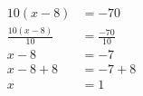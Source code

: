 \documentclass[12pt]{article}
\begin{document}
\begin{multicols}{2}
\begin{minipage}[t]{0.45\textwidth}
    \raggedright %
    \begin{align*} %
        10(x - 8) &= -70\\
        \frac{10(x-8)}{10} &= \frac{-70}{10}\\
        x - 8 &= -7\\
        x - 8 + 8 &= -7 + 8\\
        x &= 1\\
    \end{align*}
\end{minipage}\newpage
    
\end{multicols}
\end{document}
